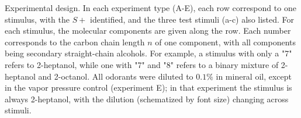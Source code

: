 \label{tab:design}
Experimental design. In each experiment type (A-E), each row correspond to one stimulus, with the $S+$ identified, and the three test stimuli (a-c) also listed.  For each stimulus, the molecular components are given along the row.  Each number corresponds to the carbon chain length $n$ of one component, with all components being secondary straight-chain alcohols.  For example, a stimulus with only a "7" refers to 2-heptanol, while one with "7" and "8" refers to a binary mixture of 2-heptanol and 2-octanol. All odorants were diluted to $0.1\%$ in mineral oil, except in the vapor pressure control (experiment E); in that experiment the stimulus is always 2-heptanol, with the dilution (schematized by font size) changing across stimuli.  
